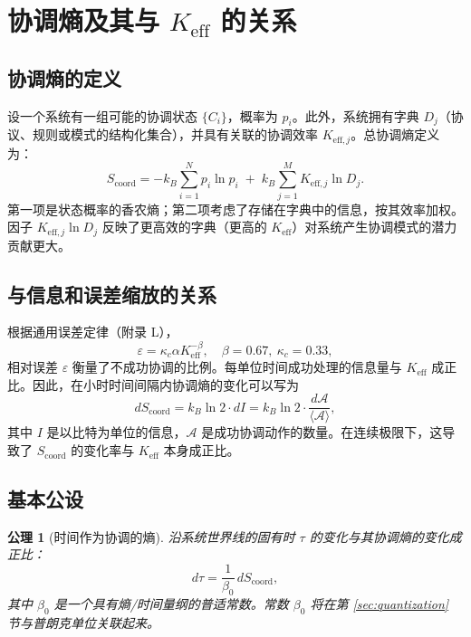\documentclass[12pt,a4paper]{article}
\newtheorem{axiom}[theorem]{公理}
\newcommand{\Keff}{K_{\mathrm{eff}}}
\newcommand{\Keffi}[1]{K_{\mathrm{eff},#1}}
\newcommand{\kappac}{\kappa_c}
\newcommand{\Scoord}{S_{\mathrm{coord}}}
\begin{document}
	\section{协调熵及其与 \(\Keff\) 的关系}
	\label{sec:coord_entropy}
	
	\subsection{协调熵的定义}
	
	设一个系统有一组可能的协调状态 \(\{C_i\}\)，概率为 \(p_i\)。此外，系统拥有字典 \(D_j\)（协议、规则或模式的结构化集合），并具有关联的协调效率 \(\Keffi{j}\)。总协调熵定义为：
	\begin{equation}
		\Scoord = -k_B \sum_{i=1}^{N} p_i \ln p_i \;+\; k_B \sum_{j=1}^{M} \Keffi{j} \ln D_j.
		\label{eq:coord_entropy_def}
	\end{equation}
	第一项是状态概率的香农熵；第二项考虑了存储在字典中的信息，按其效率加权。因子 \(\Keffi{j} \ln D_j\) 反映了更高效的字典（更高的 \(\Keff\)）对系统产生协调模式的潜力贡献更大。
	
	\subsection{与信息和误差缩放的关系}
	
	根据通用误差定律（附录 L），
	\begin{equation}
		\varepsilon = \kappac \alpha \Keff^{-\beta}, \quad \beta = 0.67,\ \kappac = 0.33,
	\end{equation}
	相对误差 \(\varepsilon\) 衡量了不成功协调的比例。每单位时间成功处理的信息量与 \(\Keff\) 成正比。因此，在小时时间间隔内协调熵的变化可以写为
	\begin{equation}
		d\Scoord = k_B \ln 2 \cdot dI = k_B \ln 2 \cdot \frac{d\mathcal{A}}{\langle \mathcal{A} \rangle},
	\end{equation}
	其中 \(I\) 是以比特为单位的信息，\(\mathcal{A}\) 是成功协调动作的数量。在连续极限下，这导致了 \(\Scoord\) 的变化率与 \(\Keff\) 本身成正比。
	
	\subsection{基本公设}
	
	\begin{axiom}[时间作为协调的熵]
		沿系统世界线的固有时 \(\tau\) 的变化与其协调熵的变化成正比：
		\begin{equation}
			d\tau = \frac{1}{\beta_0} \, d\Scoord,
			\label{eq:time_entropy}
		\end{equation}
		其中 \(\beta_0\) 是一个具有熵/时间量纲的普适常数。常数 \(\beta_0\) 将在第 \ref{sec:quantization} 节与普朗克单位关联起来。
	\end{axiom}
	
\end{document}
